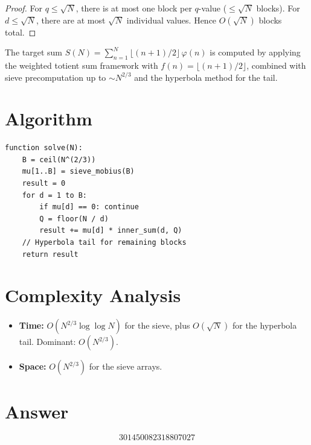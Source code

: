 \documentclass[12pt]{article}
\begin{document}
\begin{proof}
For $q \le \sqrt{N}$, there is at most one block per $q$-value ($\le \sqrt{N}$ blocks). For $d \le \sqrt{N}$, there are at most $\sqrt{N}$ individual values. Hence $O(\sqrt{N})$ blocks total.
\end{proof}

The target sum $S(N) = \sum_{n=1}^{N}\lfloor(n+1)/2\rfloor\,\varphi(n)$ is computed by applying the weighted totient sum framework with $f(n) = \lfloor(n+1)/2\rfloor$, combined with sieve precomputation up to $\sim N^{2/3}$ and the hyperbola method for the tail.

\section{Algorithm}

\begin{verbatim}
function solve(N):
    B = ceil(N^(2/3))
    mu[1..B] = sieve_mobius(B)
    result = 0
    for d = 1 to B:
        if mu[d] == 0: continue
        Q = floor(N / d)
        result += mu[d] * inner_sum(d, Q)
    // Hyperbola tail for remaining blocks
    return result
\end{verbatim}

\section{Complexity Analysis}

\begin{itemize}
\item \textbf{Time:} $O(N^{2/3}\log\log N)$ for the sieve, plus $O(\sqrt{N})$ for the hyperbola tail. Dominant: $O(N^{2/3})$.
\item \textbf{Space:} $O(N^{2/3})$ for the sieve arrays.
\end{itemize}

\section{Answer}

\[
\boxed{301450082318807027}
\]
\end{document}
